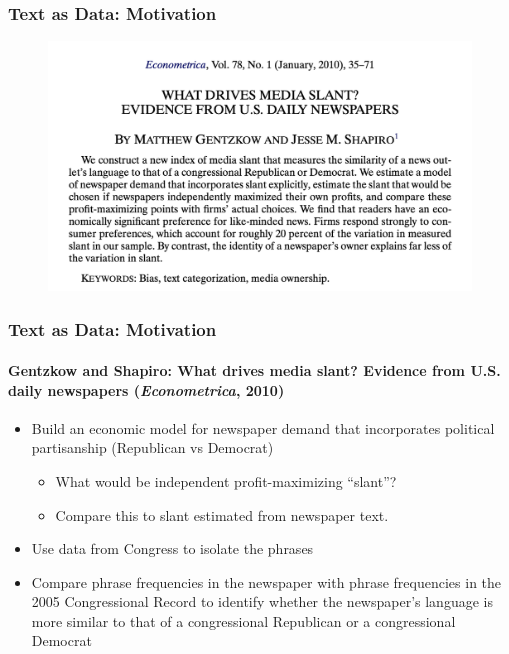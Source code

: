 \documentclass[
  shownotes,
  xcolor={svgnames},
  hyperref={colorlinks,citecolor=DarkBlue,linkcolor=DarkRed,urlcolor=DarkBlue}
  , aspectratio=169]{beamer}
\newcommand{\bk}{\color{black}}
\newcommand{\rd}{\color{red}}
\newcommand{\bl}{\color{blue}}
\begin{document}
\begin{frame}[fragile]
\frametitle{Text as Data: Motivation}


  \begin{figure}[H] \centering
            \captionsetup{justification=centering}
              \includegraphics[scale=0.6]{figures/gentzgow_shapiro}
              
 \end{figure}

\end{frame}
\begin{frame}[fragile]
\frametitle{Text as Data: Motivation}
\framesubtitle{Gentzkow and Shapiro: What drives media slant?  Evidence from U.S. daily newspapers ({\it Econometrica}, 2010)}

\begin{itemize}
\item Build an economic model for newspaper demand that incorporates political partisanship (\rd Republican \bk vs \bl Democrat\bk)

\medskip
 
\begin{itemize}
\item What would be independent profit-maximizing ``slant''?
\medskip
\item Compare this to slant estimated from newspaper text.
\end{itemize}
\medskip

\item Use data from Congress to isolate the phrases
\medskip
\item Compare phrase frequencies in the newspaper with phrase frequencies in the 2005 Congressional Record to identify whether the newspaper’s language is more similar to that of a congressional Republican or a congressional Democrat

\end{itemize}
\end{frame}
\end{document}
